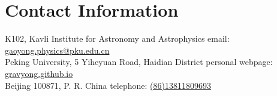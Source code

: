 \section{\sc Contact Information}
K102, Kavli Institute for Astronomy and Astrophysics      \hfill email: \href{mailto:gaoyong.physics@pku.edu.cn}{gaoyong.physics@pku.edu.cn}\\
Peking University, 5 Yiheyuan Road, Haidian District       \hfill personal webpage: \href{https://gravyong.github.io/}{gravyong.github.io}\\
Beijing 100871, P. R. China                                \hfill telephone: \href{tel:8613811809693}{(86)13811809693}


